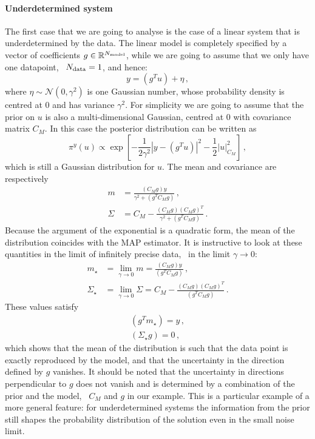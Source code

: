 \paragraph{Underdetermined system}
The first case that we are going to analyse is the case of a linear system that
is underdetermined by the data. The linear model is completely specified by a
vector of coefficients $g\in \mathbb{R}^{N_{\rm model}}$, while we are going to assume
that we only have one datapoint, \ie\ $N_{\rm data}=1$, and hence:
\begin{equation}
  \label{eq:LinearModelEx}
  y = (g^T u) + \eta\, ,
\end{equation}
where $\eta \sim \mathcal{N}(0,\gamma^2)$ is one Gaussian number, whose
probability density is centred at $0$ and has variance $\gamma^2$. For
simplicity we are going to assume that the prior on $u$ is also a
multi-dimensional Gaussian, centred at $0$ with covariance matrix $C_M$. In
this case the posterior distribution can be written as
\begin{equation}
  \label{eq:GaussPostExplicit}
    \pi^y(u) \propto \exp \left[
    -\frac{1}{2\gamma^2} \left|y - (g^T u) \right|^2 - \frac12 \left|
      u
    \right|_{C_M}^2 
    \right]\, ,
\end{equation}
which is still a Gaussian distribution for $u$. The mean and covariance are
respectively
\begin{align}
  m &= \frac{(C_M g) y}{\gamma^2 + (g^T C_M g)}\, , \\
  \Sigma &= C_M - 
  \frac{(C_M g) (C_M g)^T}{\gamma^2 + (g^T C_M g)}\, .
\end{align}
Because the argument of the exponential is a quadratic form, the mean of the
distribution coincides with the MAP estimator. It is instructive to look at
these quantities in the limit of infinitely precise data, \ie\ in the limit
$\gamma\to 0$:
\begin{align}
  m_\star &= 
  \lim_{\gamma\to 0} m
  = \frac{(C_M g) y}{(g^T C_M g)}\, , \\
  \Sigma_\star &= 
  \lim_{\gamma\to 0} \Sigma 
  = C_M - 
  \frac{(C_M g) (C_M g)^T}{(g^T C_M g)}\, .
\end{align}
These values satisfy
\begin{align}
  (g^T m_\star) = y \, , \\
  (\Sigma_\star g) = 0 \, ,
\end{align}
which shows that the mean of the distribution is such that the data point is
exactly reproduced by the model, and that the uncertainty in the direction
defined by $g$ vanishes. It should be noted that the uncertainty in directions
perpendicular to $g$ does not vanish and is determined by a combination of the
prior and the model, \viz\ $C_M$ and $g$ in our example. This is a
particular example of a more general feature: for underdetermined systems the
information from the prior still shapes the probability distribution of the
solution even in the small noise limit.  

